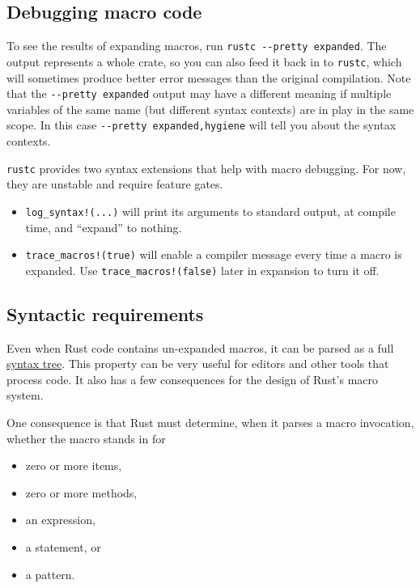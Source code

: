 \documentclass[a4paper,]{book}
\providecommand{\tightlist}{%
  \setlength{\itemsep}{0pt}\setlength{\parskip}{0pt}}
\begin{document}
\hypertarget{debugging-macro-code}{\subsection{Debugging macro
code}\label{debugging-macro-code}}

To see the results of expanding macros, run
\texttt{rustc\ -\/-pretty\ expanded}. The output represents a whole
crate, so you can also feed it back in to \texttt{rustc}, which will
sometimes produce better error messages than the original compilation.
Note that the \texttt{-\/-pretty\ expanded} output may have a different
meaning if multiple variables of the same name (but different syntax
contexts) are in play in the same scope. In this case
\texttt{-\/-pretty\ expanded,hygiene} will tell you about the syntax
contexts.

\texttt{rustc} provides two syntax extensions that help with macro
debugging. For now, they are unstable and require feature gates.

\begin{itemize}
\item
  \texttt{log\_syntax!(...)} will print its arguments to standard
  output, at compile time, and ``expand'' to nothing.
\item
  \texttt{trace\_macros!(true)} will enable a compiler message every
  time a macro is expanded. Use \texttt{trace\_macros!(false)} later in
  expansion to turn it off.
\end{itemize}

\subsection{Syntactic requirements}\label{syntactic-requirements}

Even when Rust code contains un-expanded macros, it can be parsed as a
full \protect\hyperlink{abstract-syntax-tree}{syntax tree}. This
property can be very useful for editors and other tools that process
code. It also has a few consequences for the design of Rust's macro
system.

One consequence is that Rust must determine, when it parses a macro
invocation, whether the macro stands in for

\begin{itemize}
\tightlist
\item
  zero or more items,
\item
  zero or more methods,
\item
  an expression,
\item
  a statement, or
\item
  a pattern.
\end{itemize}
\end{document}
